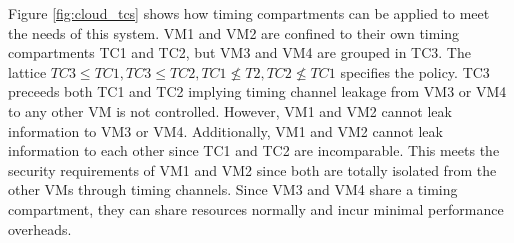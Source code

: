 Figure \ref{fig:cloud_tcs} shows how timing compartments can be applied to meet 
the needs of this system. VM1 and VM2 are confined to their own timing 
compartments TC1 and TC2, but VM3 and VM4 are grouped in TC3.  The lattice $TC3 
\leq TC1, TC3 \leq TC2, TC1 \nleq T2, TC2 \nleq TC1$ specifies the policy. TC3 
preceeds both TC1 and TC2 implying timing channel leakage from VM3 or VM4 to 
any other VM is not controlled. However, VM1 and VM2 cannot leak information to 
VM3 or VM4. Additionally, VM1 and VM2 cannot leak information to each other 
since TC1 and TC2 are incomparable. This meets the security requirements of VM1 
and VM2 since both are totally isolated from the other VMs through timing 
channels. Since VM3 and VM4 share a timing compartment, they can share 
resources normally and incur minimal performance overheads.
